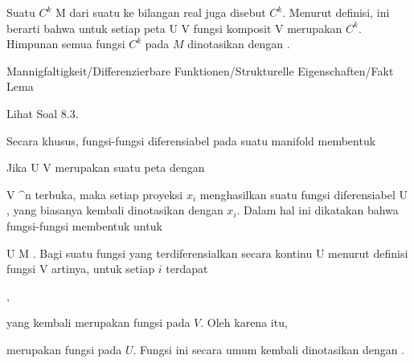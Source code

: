 
Suatu
$C^k$
 {M} {\R
} {}
dari suatu
ke bilangan real juga disebut  {} $C^k$. Menurut definisi, ini berarti bahwa untuk setiap peta
\maabbdisp {\alpha} {U} {V
} {}
fungsi komposit
 {V} {\R
} {}
merupakan
$C^k$. Himpunan semua fungsi $C^k$ pada $M$ dinotasikan dengan
.


{Mannigfaltigkeit/Differenzierbare Funktionen/Strukturelle Eigenschaften/Fakt}
{Lema}
{}
{

\faktzusatz {}
\faktzusatz {}

 }
{ Lihat Soal 8.3. }

Secara khusus, fungsi-fungsi diferensiabel pada suatu manifold membentuk

Jika
\maabbdisp {\alpha} {U} {V
} {}
merupakan suatu peta dengan

\mavergleichskette
{\vergleichskette
{ V
}
{ \subseteq }{ \R^n
}
{  }{
}
{    }{
}
{   }{
}
}
{}{}{}
terbuka, maka setiap proyeksi $x_i$ menghasilkan suatu fungsi diferensiabel
 {U} {\R
} {,}
yang biasanya kembali dinotasikan dengan $x_i$. Dalam hal ini dikatakan bahwa fungsi-fungsi
 membentuk  {} untuk

\mavergleichskette
{\vergleichskette
{ U
}
{ \subseteq }{ M
}
{  }{
}
{    }{
}
{   }{
}
}
{}{}{}
.
Bagi suatu fungsi yang terdiferensialkan secara kontinu
 {U} {\R
} {}
menurut definisi fungsi
 {V} {\R
} {}
artinya, untuk setiap $i$ terdapat

 { , }

yang kembali merupakan fungsi
 {} {}
pada $V$. Oleh karena itu,

 {  }

merupakan fungsi pada $U$. Fungsi ini secara umum kembali dinotasikan dengan
.
